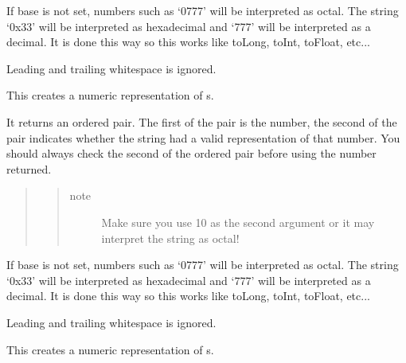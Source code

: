 \documentclass[letterpaper,10pt,english]{sphinxmanual}
\begin{document}
\begin{fulllineitems}
\begin{fulllineitems}
\begin{quote}
\begin{quote}
\begin{description}
\end{description}\end{quote}
\end{quote}

If base is not set, numbers such as `0777' will be interpreted as octal.  The string `0x33' will
be interpreted as hexadecimal and `777' will be interpreted as a decimal.  It is done this way
so this works like toLong, toInt, toFloat, etc...

Leading and trailing whitespace is ignored.

\end{fulllineitems}


\begin{fulllineitems}
\label{index:qsdn.QSDNLocale.toULongLong}
This creates a numeric representation of s.

It returns an ordered pair.  The first of the pair is the number, the second of the pair indicates whether the string had a valid representation of that number.  You should always check the second of the ordered pair before using the number returned.
\begin{quote}
\begin{quote}\begin{description}
\item[{note}] \leavevmode
Make sure you use 10 as the second argument or it may interpret the string as octal!

\end{description}\end{quote}
\end{quote}

If base is not set, numbers such as `0777' will be interpreted as octal.  The string `0x33' will
be interpreted as hexadecimal and `777' will be interpreted as a decimal.  It is done this way
so this works like toLong, toInt, toFloat, etc...

Leading and trailing whitespace is ignored.

\end{fulllineitems}


\begin{fulllineitems}
\label{index:qsdn.QSDNLocale.toUShort}
This creates a numeric representation of s.


\end{fulllineitems}
\end{fulllineitems}
\end{document}
